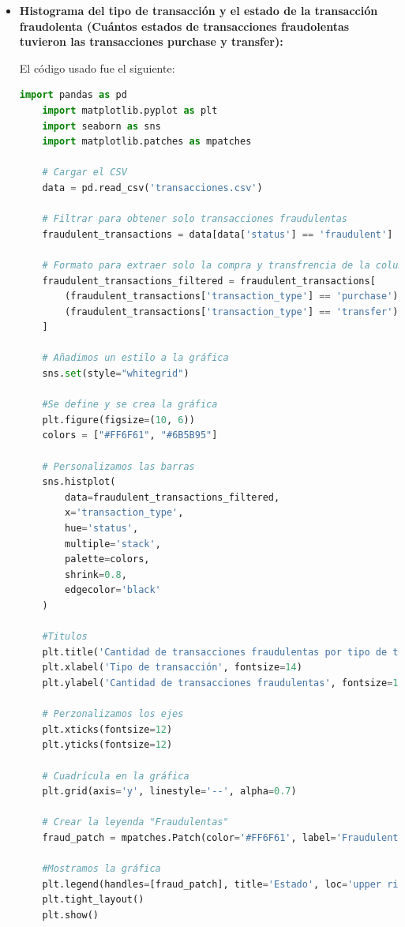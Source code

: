 \documentclass{article}
\begin{document}
\begin{itemize}
    \item \textbf{Histograma del tipo de transacción y el estado de la transacción fraudolenta (Cuántos estados de transacciones fraudolentas tuvieron las transacciones purchase y transfer):}

    El código usado fue el siguiente:

    \begin{lstlisting}[language=Python, caption=Implementación DES(Data Encryption Standard)]
    import pandas as pd
    import matplotlib.pyplot as plt
    import seaborn as sns
    import matplotlib.patches as mpatches

    # Cargar el CSV
    data = pd.read_csv('transacciones.csv')

    # Filtrar para obtener solo transacciones fraudulentas
    fraudulent_transactions = data[data['status'] == 'fraudulent']

    # Formato para extraer solo la compra y transfrencia de la columna 'purchase' y 'transfer'
    fraudulent_transactions_filtered = fraudulent_transactions[
        (fraudulent_transactions['transaction_type'] == 'purchase') | 
        (fraudulent_transactions['transaction_type'] == 'transfer')
    ]

    # Añadimos un estilo a la gráfica
    sns.set(style="whitegrid")

    #Se define y se crea la gráfica
    plt.figure(figsize=(10, 6)) 
    colors = ["#FF6F61", "#6B5B95"]

    # Personalizamos las barras
    sns.histplot(
        data=fraudulent_transactions_filtered, 
        x='transaction_type', 
        hue='status', 
        multiple='stack', 
        palette=colors,
        shrink=0.8,  
        edgecolor='black'  
    )

    #Titulos
    plt.title('Cantidad de transacciones fraudulentas por tipo de transacción', fontsize=16, fontweight='bold')
    plt.xlabel('Tipo de transacción', fontsize=14)
    plt.ylabel('Cantidad de transacciones fraudulentas', fontsize=14)

    # Perzonalizamos los ejes
    plt.xticks(fontsize=12)
    plt.yticks(fontsize=12)

    # Cuadrícula en la gráfica 
    plt.grid(axis='y', linestyle='--', alpha=0.7)

    # Crear la leyenda "Fraudulentas"
    fraud_patch = mpatches.Patch(color='#FF6F61', label='Fraudulentas')

    #Mostramos la gráfica
    plt.legend(handles=[fraud_patch], title='Estado', loc='upper right', fontsize=12)
    plt.tight_layout()
    plt.show()
    \end{lstlisting}


\end{itemize}
\end{document}
